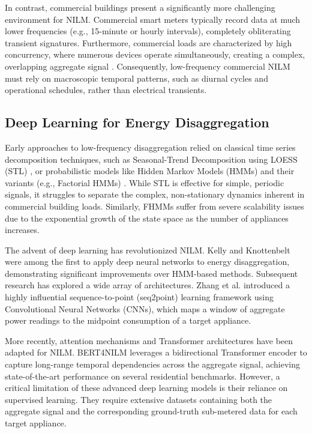 In contrast, commercial buildings present a significantly more challenging environment for NILM. Commercial smart meters typically record data at much lower frequencies (e.g., 15-minute or hourly intervals), completely obliterating transient signatures. Furthermore, commercial loads are characterized by high concurrency, where numerous devices operate simultaneously, creating a complex, overlapping aggregate signal \cite{nilm_survey_1}. Consequently, low-frequency commercial NILM must rely on macroscopic temporal patterns, such as diurnal cycles and operational schedules, rather than electrical transients.

\subsection{Deep Learning for Energy Disaggregation}
Early approaches to low-frequency disaggregation relied on classical time series decomposition techniques, such as Seasonal-Trend Decomposition using LOESS (STL) \cite{stl_1990}, or probabilistic models like Hidden Markov Models (HMMs) and their variants (e.g., Factorial HMMs) \cite{fhmm_2012}. While STL is effective for simple, periodic signals, it struggles to separate the complex, non-stationary dynamics inherent in commercial building loads. Similarly, FHMMs suffer from severe scalability issues due to the exponential growth of the state space as the number of appliances increases.

The advent of deep learning has revolutionized NILM. Kelly and Knottenbelt \cite{kelly_2015} were among the first to apply deep neural networks to energy disaggregation, demonstrating significant improvements over HMM-based methods. Subsequent research has explored a wide array of architectures. Zhang et al. \cite{zhang_2018} introduced a highly influential sequence-to-point (seq2point) learning framework using Convolutional Neural Networks (CNNs), which maps a window of aggregate power readings to the midpoint consumption of a target appliance.

More recently, attention mechanisms and Transformer architectures have been adapted for NILM. BERT4NILM \cite{bert4nilm} leverages a bidirectional Transformer encoder to capture long-range temporal dependencies across the aggregate signal, achieving state-of-the-art performance on several residential benchmarks. However, a critical limitation of these advanced deep learning models is their reliance on supervised learning. They require extensive datasets containing both the aggregate signal and the corresponding ground-truth sub-metered data for each target appliance.

